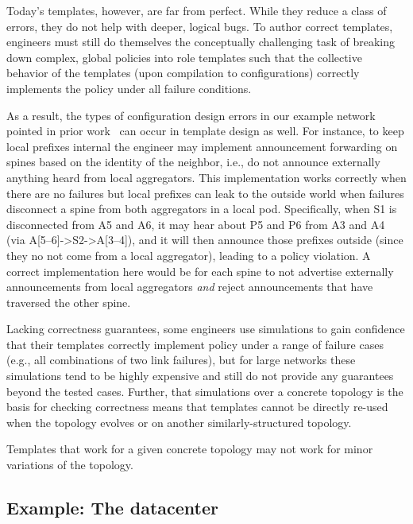 \documentclass{sig-alternate-10pt}
\begin{document}
Today's templates, however, are far from perfect. While they reduce a class of errors, they do not help with deeper, logical bugs.
To author correct templates, engineers must still do themselves the conceptually challenging task of breaking down complex, global policies into role templates such that the collective behavior of the templates (upon compilation to configurations) correctly implements the policy under all failure conditions. 

As a result, the types of configuration design errors in our example network pointed in prior work~\cite{propane} can occur in template design as well. For instance, to keep local prefixes internal the engineer may implement announcement forwarding on spines based on the identity of the neighbor, i.e., do not announce externally anything heard from local aggregators. This implementation works correctly when there are no failures but local prefixes can leak to the outside world when failures disconnect a spine from both aggregators in a local pod. Specifically, when S1 is disconnected from A5 and A6, it may hear about P5 and P6 from A3 and A4 (via A[5--6]->S2->A[3--4]), and it will then announce those prefixes outside (since they no not come from a local aggregator), leading to a policy violation. A correct implementation here would be for each spine to not advertise externally announcements from local aggregators {\em and} reject announcements that have traversed the other spine.

Lacking correctness guarantees, some engineers use simulations to gain confidence that their templates correctly implement policy under a range of failure cases (e.g., all combinations of two link failures), but for large networks these simulations tend to be highly expensive and still do not provide any guarantees beyond the tested cases. Further, that simulations over a concrete topology is the basis for checking correctness means that templates cannot be directly re-used when the topology evolves or on another similarly-structured topology. 

Templates that work for a given concrete topology may not work for minor variations of the topology.

\subsection{Example:  The datacenter}
\end{document}
